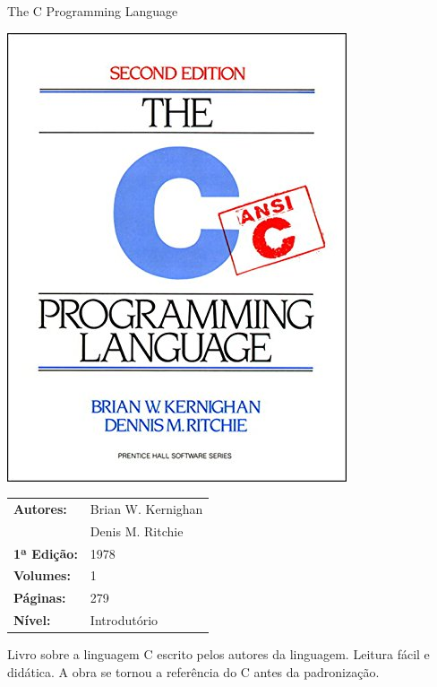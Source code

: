 \begin{frame}[fragile]{The C Programming Language}

    \begin{minipage}{0.4\textwidth}
        \includegraphics[scale=0.25]{kr.jpg}
    \end{minipage}
    \begin{minipage}{0.5\textwidth}
        \begin{small}
            \begin{tabularx}{0.95\textwidth}{lX}
                \textbf{Autores:} & Brian W. Kernighan \\
                & Denis M. Ritchie \\
                \textbf{1ª Edição:} & 1978 \\
                \textbf{Volumes:} & 1 \\
                \textbf{Páginas:} & 279 \\
                \textbf{Nível:} & Introdutório \\
            \end{tabularx}
        \end{small}
    \end{minipage}

    \vspace{0.2in} 

    Livro sobre a linguagem C escrito pelos autores da linguagem. Leitura fácil e
    didática. A obra se tornou a referência do C antes da padronização.

\end{frame}

